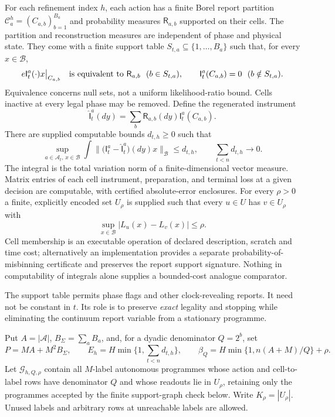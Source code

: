 \begin{definition}\label{def:effective}
For each refinement index $h$, each action has a finite Borel report partition $\mathcal C_a^h=(C_{a,b})_{b=1}^{B_a}$ and probability measures $\mathsf R_{a,b}$ supported on their cells. The partition and reconstruction measures are independent of phase and physical state. They come with a finite support table $S_{t,a}\subseteq\{1,\ldots,B_a\}$ such that, for every $x\in\mathcal B$,
\[
 e\mathsf I_t^a(\cdot)x\big|_{C_{a,b}}
 \quad\hbox{is equivalent to }\mathsf R_{a,b}\ \ (b\in S_{t,a}),
 \qquad \mathsf I_t^a(C_{a,b})=0\ \ (b\notin S_{t,a}).
\]
Equivalence concerns null sets, not a uniform likelihood-ratio bound. Cells inactive at every legal phase may be removed. Define the regenerated instrument
\[
 \widehat{\mathsf I}_t^a(dy)=
       \sum_b\mathsf R_{a,b}(dy)\mathsf I_t^a(C_{a,b}).
\]
There are supplied computable bounds $d_{t,h}\ge0$ such that
\begin{equation}\label{eq:instrument_error}
 \sup_{a\in\mathcal A_t,\,x\in\mathcal B}
 \int\big\|\big(\mathsf I_t^a-\widehat{\mathsf I}_t^a\big)(dy)x\big\|_{\mathcal B}
 \le d_{t,h},\qquad \sum_{t<n}d_{t,h}\longrightarrow0.
\end{equation}
The integral is the total variation norm of a finite-dimensional vector measure. Matrix entries of each cell instrument, preparation, and terminal loss at a given decision are computable, with certified absolute-error enclosures. For every $\rho>0$ a finite, explicitly encoded set $U_\rho$ is supplied such that every $u\in U$ has $v\in U_\rho$ with
\[
 \sup_{x\in\mathcal B}|L_u(x)-L_v(x)|\le\rho.
\]
Cell membership is an executable operation of declared description, scratch and time cost; alternatively an implementation provides a separate probability-of-misbinning certificate and preserves the report support signature. Nothing in computability of integrals alone supplies a bounded-cost analogue comparator.
\end{definition}
The support table permits phase flags and other clock-revealing reports. It need not be constant in $t$. Its role is to preserve \emph{exact} legality and stopping while eliminating the continuum report variable from a stationary programme.

Put $A=|\mathcal A|$, $B_\Sigma=\sum_a B_a$, and, for a dyadic denominator $Q=2^b$, set
\begin{equation}\label{eq:effective_constants}
 P=MA+M^2B_\Sigma,\qquad
 E_h=H\min\{1,\sum_{t<n}d_{t,h}\},\qquad
 \beta_Q=H\min\{1,n(A+M)/Q\}+\rho.
\end{equation}
Let $\mathscr G_{h,Q,\rho}$ contain all $M$-label autonomous programmes whose action and cell-to-label rows have denominator $Q$ and whose readouts lie in $U_\rho$, retaining only the programmes accepted by the finite support-graph check below. Write $K_\rho=|U_\rho|$. Unused labels and arbitrary rows at unreachable labels are allowed.


